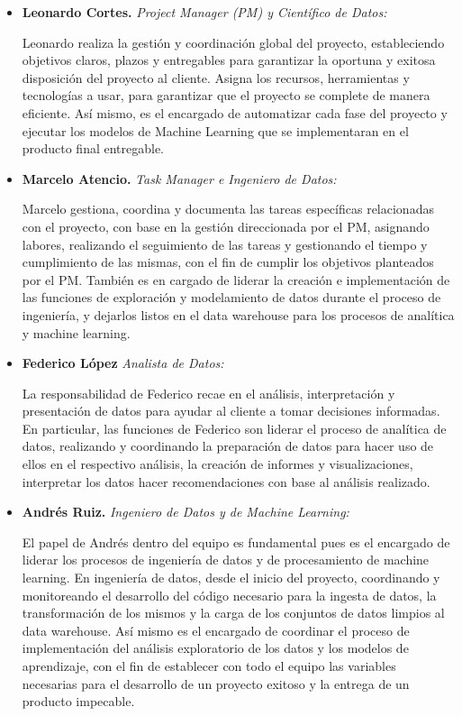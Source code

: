 \documentclass[12pt]{article}
\begin{document}
\begin{itemize}
    \item \textbf{Leonardo Cortes.} \textit{Project Manager (PM) y Científico de Datos:}
    
    Leonardo realiza la gestión y coordinación global del proyecto,  estableciendo objetivos claros, plazos y entregables para garantizar la  oportuna y exitosa disposición del proyecto al cliente.
    Asigna los recursos, herramientas y tecnologías a usar, para garantizar que el proyecto se complete de manera eficiente. Así mismo,  es el encargado de automatizar cada fase del proyecto y ejecutar los modelos de Machine Learning que se implementaran en el producto final entregable.

    \item \textbf{Marcelo Atencio.} \textit{Task Manager e Ingeniero de Datos:}
    
     Marcelo gestiona, coordina y documenta las tareas específicas relacionadas con el proyecto, con base en la gestión direccionada por el PM, asignando labores, realizando el seguimiento de las tareas y gestionando el tiempo y cumplimiento de las mismas, con el fin de cumplir los objetivos planteados por el PM. También es en cargado de liderar la creación e implementación de las funciones de exploración y modelamiento de datos durante el proceso de ingeniería, y dejarlos listos en el data warehouse para los procesos de analítica y machine learning. 

     \item \textbf{Federico López} \textit{Analista de Datos:}

     La responsabilidad de Federico recae en el análisis, interpretación y presentación de datos para ayudar al cliente a tomar decisiones informadas. En particular, las funciones de Federico son liderar el proceso de analítica de datos, realizando y coordinando la preparación de datos para hacer uso de ellos en el respectivo análisis, la creación de informes y visualizaciones, interpretar los datos hacer recomendaciones con base al análisis realizado. 

     \item \textbf{Andrés Ruiz.} \textit{Ingeniero de Datos y de Machine Learning:}

     El papel de Andrés dentro del equipo es fundamental pues es el encargado de liderar los procesos de ingeniería de datos y de procesamiento de machine learning. En ingeniería de datos, desde el inicio del proyecto, coordinando y  monitoreando el desarrollo del código necesario para la ingesta de datos, la transformación de los mismos y la carga de los conjuntos de datos limpios al data warehouse. Así mismo es el encargado de coordinar el proceso de implementación del análisis exploratorio de los datos y los modelos de aprendizaje, con el fin de establecer con todo el equipo las variables necesarias para el desarrollo de un proyecto exitoso y la entrega de un producto impecable.
\end{itemize}
\end{document}
